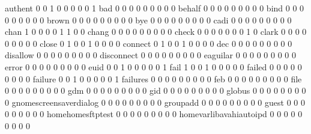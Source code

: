 \documentclass[compress,8pt]{beamer}
\begin{document}
\begin{frame}
\begin{Schunk}
  authent                                    0   0   1   0   0   0   0   0   1
  bad                                        0   0   0   0   0   0   0   0   0
  behalf                                     0   0   0   0   0   0   0   0   0
  bind                                       0   0   0   0   0   0   0   0   0
  brown                                      0   0   0   0   0   0   0   0   0
  bye                                        0   0   0   0   0   0   0   0   0
  cadi                                       0   0   0   0   0   0   0   0   0
  chan                                       1   0   0   0   0   1   1   0   0
  chang                                      0   0   0   0   0   0   0   0   0
  check                                      0   0   0   0   0   0   0   1   0
  clark                                      0   0   0   0   0   0   0   0   0
  close                                      0   1   0   0   1   0   0   0   0
  connect                                    0   1   0   0   1   0   0   0   0
  dec                                        0   0   0   0   0   0   0   0   0
  disallow                                   0   0   0   0   0   0   0   0   0
  disconnect                                 0   0   0   0   0   0   0   0   0
  eaguilar                                   0   0   0   0   0   0   0   0   0
  error                                      0   0   0   0   0   0   0   0   0
  euid                                       0   0   1   0   0   0   0   0   1
  fail                                       1   0   0   1   0   0   0   0   0
  failed                                     0   0   0   0   0   0   0   0   0
  failure                                    0   0   1   0   0   0   0   0   1
  failures                                   0   0   0   0   0   0   0   0   0
  feb                                        0   0   0   0   0   0   0   0   0
  file                                       0   0   0   0   0   0   0   0   0
  gdm                                        0   0   0   0   0   0   0   0   0
  gid                                        0   0   0   0   0   0   0   0   0
  globus                                     0   0   0   0   0   0   0   0   0
  gnomescreensaverdialog                     0   0   0   0   0   0   0   0   0
  groupadd                                   0   0   0   0   0   0   0   0   0
  guest                                      0   0   0   0   0   0   0   0   0
  homehomesftptest                           0   0   0   0   0   0   0   0   0
  homevarlibavahiautoipd                     0   0   0   0   0   0   0   0   0

\end{Schunk}
\end{frame}
\end{document}
